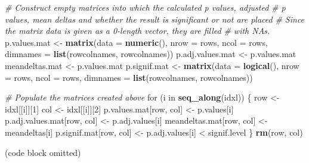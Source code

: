 \documentclass[a4paper]{article}
\newenvironment{Shaded}{\begin{snugshade}}{\end{snugshade}}
\newcommand{\KeywordTok}[1]{\textcolor[rgb]{0.13,0.29,0.53}{\textbf{{#1}}}}
\newcommand{\DataTypeTok}[1]{\textcolor[rgb]{0.13,0.29,0.53}{{#1}}}
\newcommand{\DecValTok}[1]{\textcolor[rgb]{0.00,0.00,0.81}{{#1}}}
\newcommand{\StringTok}[1]{\textcolor[rgb]{0.31,0.60,0.02}{{#1}}}
\newcommand{\CommentTok}[1]{\textcolor[rgb]{0.56,0.35,0.01}{\textit{{#1}}}}
\newcommand{\NormalTok}[1]{{#1}}
\begin{document}
\begin{Shaded}
\begin{Highlighting}[]
\CommentTok{# Construct empty matrices into which the calculated p values, adjusted}
\CommentTok{# p values, mean deltas and whether the result is significant or not are placed}
\CommentTok{# Since the matrix data is given as a 0-length vector, they are filled}
\CommentTok{# with NAs.}
\NormalTok{p.values.mat <-}\StringTok{ }\KeywordTok{matrix}\NormalTok{(}\DataTypeTok{data =} \KeywordTok{numeric}\NormalTok{(), }\DataTypeTok{nrow =} \NormalTok{rows, }\DataTypeTok{ncol =} \NormalTok{rows,}
                       \DataTypeTok{dimnames =} \KeywordTok{list}\NormalTok{(rowcolnames, rowcolnames))}
\NormalTok{p.adj.values.mat <-}\StringTok{ }\NormalTok{p.values.mat}
\NormalTok{meandeltas.mat <-}\StringTok{ }\NormalTok{p.values.mat}
\NormalTok{p.signif.mat <-}\StringTok{ }\KeywordTok{matrix}\NormalTok{(}\DataTypeTok{data =} \KeywordTok{logical}\NormalTok{(), }\DataTypeTok{nrow =} \NormalTok{rows, }\DataTypeTok{ncol =} \NormalTok{rows,}
                       \DataTypeTok{dimnames =} \KeywordTok{list}\NormalTok{(rowcolnames, rowcolnames))}

\CommentTok{# Populate the matrices created above}
\NormalTok{for (i in }\KeywordTok{seq_along}\NormalTok{(idxl))}
\NormalTok{\{}
    \NormalTok{row <-}\StringTok{ }\NormalTok{idxl[[i]][}\DecValTok{1}\NormalTok{]}
    \NormalTok{col <-}\StringTok{ }\NormalTok{idxl[[i]][}\DecValTok{2}\NormalTok{]}
    \NormalTok{p.values.mat[row, col] <-}\StringTok{ }\NormalTok{p.values[i]}
    \NormalTok{p.adj.values.mat[row, col] <-}\StringTok{ }\NormalTok{p.adj.values[i]}
    \NormalTok{meandeltas.mat[row, col] <-}\StringTok{ }\NormalTok{meandeltas[i]}
    \NormalTok{p.signif.mat[row, col] <-}\StringTok{ }\NormalTok{p.adj.values[i] <}\StringTok{ }\NormalTok{signif.level}
\NormalTok{\}}
\KeywordTok{rm}\NormalTok{(row, col)}
\end{Highlighting}
\end{Shaded}

(code block omitted)
\end{document}
